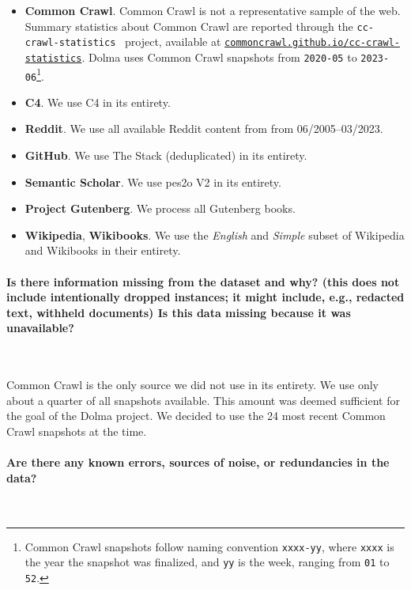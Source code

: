 \documentclass{article}
\newcommand{\dolma}{Dolma\xspace}
\begin{document}
\begin{itemize}[leftmargin=1em]
    \item \textbf{Common Crawl}. Common Crawl is not a representative sample of the web. Summary statistics about Common Crawl are reported through the \texttt{cc-crawl-statistics}~\citep{cc-crawl-statistics} project, available at \href{https://commoncrawl.github.io/cc-crawl-statistics/}{\texttt{commoncrawl.github.io/cc-crawl-statistics}}. \dolma uses  Common Crawl snapshots from \texttt{2020-05} to \texttt{2023-06}\footnote{Common Crawl snapshots follow naming convention \texttt{xxxx-yy}, where \texttt{xxxx} is the year the snapshot was finalized, and \texttt{yy} is the week, ranging from \texttt{01} to \texttt{52}.}.
    \item \textbf{C4}. We use C4 in its entirety. 
    \item \textbf{Reddit}. We use all available Reddit content from from 06/2005--03/2023.
    \item \textbf{GitHub}. We use The Stack (deduplicated) in its entirety. 
    \item \textbf{Semantic Scholar}. We use pes2o V2 in its entirety. 
    \item \textbf{Project Gutenberg}. We process all Gutenberg books. 
    \item \textbf{Wikipedia}, \textbf{Wikibooks}. We use the \textit{English} and \textit{Simple} subset of Wikipedia and Wikibooks in their entirety.  
\end{itemize}

\paragraph{Is there information missing from the dataset and why? (this does not include intentionally dropped instances; it might include, e.g., redacted text, withheld documents) Is this data missing because it was unavailable?}~

Common Crawl is the only source we did not use in its entirety. 
We use only about a quarter of all snapshots available. 
This amount was deemed sufficient for the goal of the \dolma project.
We decided to use the 24 most recent Common Crawl snapshots at the time.

\paragraph{Are there any known errors, sources of noise, or redundancies in the data?}~
\end{document}
